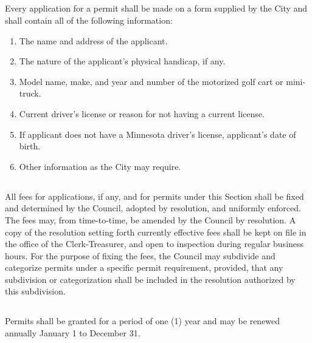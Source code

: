 \subsection{}
Every application for a permit shall be made on a form supplied by the City and shall contain all of the following information:
\begin{enumerate}[{\indent}1)]
    \item The name and address of the applicant.
    \item The nature of the applicant’s physical handicap, if any.
    \item Model name, make, and year and number of the motorized golf cart or mini-truck.
    \item Current driver’s license or reason for not having a current license.
    \item If applicant does not have a Minnesota driver’s license, applicant’s date of birth.
    \item Other information as the City may require.
\end{enumerate}
\subsection{}
All fees for applications, if any, and for permits under this Section shall be fixed and determined by the Council, adopted by resolution, and uniformly enforced.  The fees may, from time-to-time, be amended by the Council by resolution.  A copy of the resolution setting forth currently effective fees shall be kept on file in the office of the Clerk-Treasurer, and open to inspection during regular business hours.  For the purpose of fixing the fees, the Council may subdivide and categorize permits under a specific permit requirement, provided, that any subdivision or categorization shall be included in the resolution authorized by this subdivision.
\subsection{}
Permits shall be granted for a period of one (1) year and may be renewed annually January 1 to December 31.
